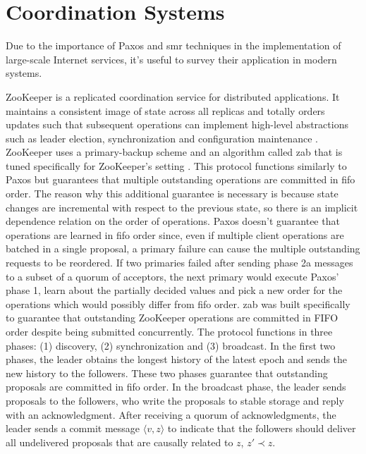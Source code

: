 \section{Coordination Systems} \label{Coordination Systems}
Due to the importance of Paxos and \acrshort{smr} techniques in the implementation of large-scale Internet services, it's useful to survey their application in modern systems.\par
ZooKeeper is a replicated coordination service for distributed applications. It maintains a consistent image of state across all replicas and totally orders updates such that subsequent operations can implement high-level abstractions such as leader election, synchronization and configuration maintenance \cite{Hunt2010}. ZooKeeper uses a primary-backup scheme and an algorithm called \acrfull{zab} that is tuned specifically for ZooKeeper's setting \cite{Junqueira2011}. This protocol functions similarly to Paxos but guarantees that multiple outstanding operations are committed in \acrfull{fifo} order. The reason why this additional guarantee is necessary is because state changes are incremental with respect to the previous state, so there is an implicit dependence relation on the order of operations. Paxos doesn't guarantee that operations are learned in \acrshort{fifo} order since, even if multiple client operations are batched in a single proposal, a primary failure can cause the multiple outstanding requests to be reordered. If two primaries failed after sending phase 2a messages to a subset of a quorum of acceptors, the next primary would execute Paxos' phase 1, learn about the partially decided values and pick a new order for the operations which would possibly differ from \acrshort{fifo} order. \acrshort{zab} was built specifically to guarantee that outstanding ZooKeeper operations are committed in FIFO order despite being submitted concurrently. The protocol functions in three phases: (1) discovery, (2) synchronization and (3) broadcast. In the  first two phases, the leader obtains the longest history of the latest epoch and sends the new history to the followers. These two phases guarantee that outstanding proposals are committed in \acrshort{fifo} order. In the broadcast phase, the leader sends proposals to the followers, who write the proposals to stable storage and reply with an acknowledgment. After receiving a quorum of acknowledgments, the leader sends a commit message $\langle v,z \rangle$ to indicate that the followers should deliver all undelivered proposals that are causally related to $z$, $z' \prec z$. \par
